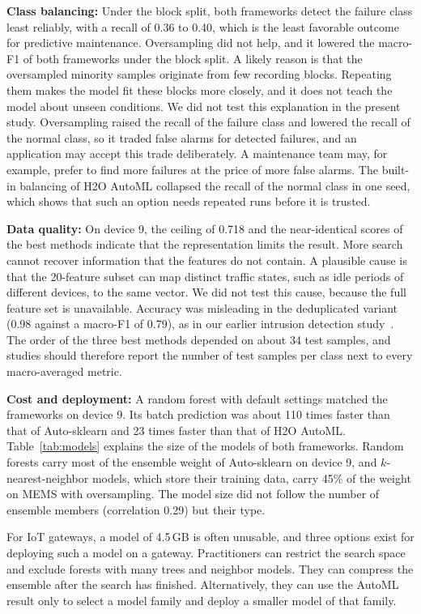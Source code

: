 \textbf{Class balancing:} Under the block split, both frameworks detect the failure class least reliably, with a recall of 0.36 to 0.40, which is the least favorable outcome for predictive maintenance. Oversampling did not help, and it lowered the macro-F1 of both frameworks under the block split. A likely reason is that the oversampled minority samples originate from few recording blocks. Repeating them makes the model fit these blocks more closely, and it does not teach the model about unseen conditions. We did not test this explanation in the present study. Oversampling raised the recall of the failure class and lowered the recall of the normal class, so it traded false alarms for detected failures, and an application may accept this trade deliberately. A maintenance team may, for example, prefer to find more failures at the price of more false alarms. The built-in balancing of H2O AutoML collapsed the recall of the normal class in one seed, which shows that such an option needs repeated runs before it is trusted.

\textbf{Data quality:} On device 9, the ceiling of 0.718 and the near-identical scores of the best methods indicate that the representation limits the result. More search cannot recover information that the features do not contain. A plausible cause is that the 20-feature subset can map distinct traffic states, such as idle periods of different devices, to the same vector. We did not test this cause, because the full feature set is unavailable. Accuracy was misleading in the deduplicated variant (0.98 against a macro-F1 of 0.79), as in our earlier intrusion detection study~\cite{velnambi2026}. The order of the three best methods depended on about 34 test samples, and studies should therefore report the number of test samples per class next to every macro-averaged metric.

\textbf{Cost and deployment:} A random forest with default settings matched the frameworks on device 9. Its batch prediction was about 110 times faster than that of Auto-sklearn and 23 times faster than that of H2O AutoML. Table~\ref{tab:models} explains the size of the models of both frameworks. Random forests carry most of the ensemble weight of Auto-sklearn on device 9, and $k$-nearest-neighbor models, which store their training data, carry 45\% of the weight on MEMS with oversampling. The model size did not follow the number of ensemble members (correlation 0.29) but their type.

For IoT gateways, a model of 4.5\,GB is often unusable, and three options exist for deploying such a model on a gateway. Practitioners can restrict the search space and exclude forests with many trees and neighbor models. They can compress the ensemble after the search has finished. Alternatively, they can use the AutoML result only to select a model family and deploy a smaller model of that family.

